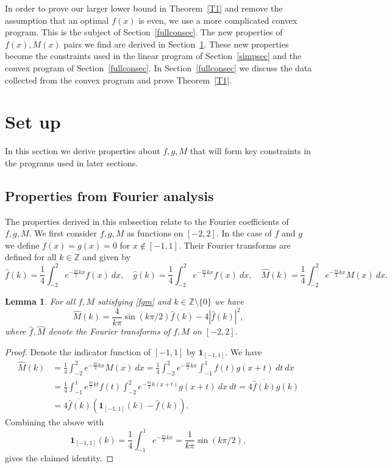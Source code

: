 \documentclass[12pt]{article}
\newtheorem{lemma}[theorem]{Lemma}
\newcommand{\ol}{\overline}
\newcommand{\ind}{\mathbf{1}}
\numberwithin{equation}{section}
\begin{document}
In order to prove our larger lower bound in Theorem~\ref{T1} and remove the assumption that an optimal $f(x)$ is even, we use a more complicated convex program. This is the subject of Section~\ref{fullconsec}. The new properties of $f(x),M(x)$ pairs we find are derived in Section~\ref{setup}. These new properties become the constraints used in the linear program of Section~\ref{simpsec} and the convex program of Section~\ref{fullconsec}. In Section~\ref{fullconsec} we discuss the data collected from the convex program and prove Theorem~\ref{T1}. 



\section{Set up}\label{setup}

In this section we derive properties about $f,g,M$ that will form key constraints in the programs used in later sections. 

\subsection{Properties from Fourier analysis}

The properties derived in this subsection relate to the Fourier coefficients of $f,g,M$. We first consider $f,g,M$ as functions on $[-2,2]$. In the case of $f$ and $g$ we define $f(x) = g(x) = 0$ for $x \not\in [-1,1]$. Their Fourier transforms are defined for all $k \in \mathbb{Z}$ and given by
\[ \hat{f}(k) = \frac{1}{4}\int_{-2}^2 e^{-\frac{\pi i}{2} kx} f(x) \ dx, \quad  \hat{g}(k) = \frac{1}{4}\int_{-2}^2 e^{-\frac{\pi i}{2} kx} f(x) \ dx, \quad  \hat{M}(k) = \frac{1}{4}\int_{-2}^2 e^{-\frac{\pi i}{2} kx} M(x) \ dx.  \]


\begin{lemma}\label{expfou} For all $f,M$ satisfying \eqref{fgm} and $k \in \mathbb{Z}\setminus\{0\}$ we have
\[ \hat{M}(k) = \frac{4}{k\pi } \sin \left(k\pi /2 \right) \ol{\hat{f}(k)} - 4|\hat{f}(k)|^2,\]
where $\hat{f},\hat{M}$ denote the Fourier transforms of $f,M$ on $[-2,2]$. 
\end{lemma}

\begin{proof} Denote the indicator function of $[-1,1]$ by $\ind_{[-1,1]}$. We have
\begin{align*}
\hat{M}(k) &= \frac{1}{4}\int_{-2}^2 e^{-\frac{\pi i}{2} kx} M(x) \ dx =\frac{1}{4}\int_{-2}^2 e^{-\frac{\pi i}{2} kx} \int_{-1}^1 f(t) g(x+t) \ dt \ dx \\
& = \frac{1}{4}\int_{-1}^1 e^{\frac{\pi i}{2} kt} f(t) \int_{-2}^2 e^{-\frac{\pi i}{2}k(x+t)} g(x+t) \ dx \ dt  = 4\ol{\hat{f}(k)}\hat{g}(k) \\
& = 4\ol{\hat{f}(k)} \left( \hat{\ind}_{[-1,1]}(k) - \hat{f}(k) \right) .
\end{align*}
Combining the above with 
\[ \hat{\ind}_{[-1,1]}(k) = \frac{1}{4} \int_{-1}^1 e^{-\frac{\pi i }{2} kx} =\frac{1}{k\pi } \sin \left(k\pi /2 \right),  \]
gives the claimed identity.
\end{proof}
\end{document}
